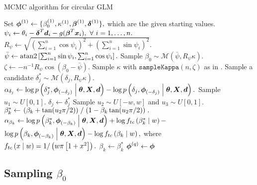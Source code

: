 \begin{algorithm}
\caption{MCMC algorithm for circular GLM}\label{alg}
\begin{algorithmic}
\State Set \( \boldsymbol{\phi}^{(1)} \gets \{ \beta_0^{(1)}, \kappa^{(1)}, \boldsymbol{\beta}^{(1)}, \boldsymbol{\delta}^{(1)} \},\) which are the given starting values.
  \State \( \psi_i \gets \theta_i - \boldsymbol{\delta}^T \boldsymbol{d}_i- g(\boldsymbol{\beta}^T \boldsymbol{x}_i ), ~ \forall ~ i = 1, \dots, n. \)
  \State \( R_\psi \gets \sqrt{ \left(\sum_{i = 1}^n \cos \psi_i \right) ^2 + \left( \sum_{i = 1}^n \sin \psi_i \right)^2}.\)
  \State \( \bar{\psi} \gets \operatorname{atan2} \left[ \sum_{i = 1}^n \sin \psi_i , \sum_{i = 1}^n \cos \psi_i  \right].\)
  \State Sample \( \beta_0 \sim \mathcal{M} \left(\bar{\psi}, R_\psi \kappa \right).\)
  \State \( \zeta \gets -  n^{-1} R_\psi \cos \left( \beta_0 - \bar{\psi} \right).\)
  \State Sample \( \kappa \) with \( \texttt{sampleKappa} (n, \zeta) \) as in \citet{forbes2015fast}.
    \State Sample a candidate \( \delta_j^{*} \sim \mathcal{M} \left( \delta_j, R_\psi \kappa \right).\)
    \State \( \alpha_{\delta_j} \gets \log p \left(\delta_j^{*}, \boldsymbol{\phi}_{(-\delta_j)} \mathrel{}\middle|\mathrel{} \boldsymbol{\theta}, \boldsymbol{X}, \boldsymbol{d} \right)  - \log p \left(\delta_j, \boldsymbol{\phi}_{(-\delta_j)} \mathrel{}\middle|\mathrel{} \boldsymbol{\theta}, \boldsymbol{X}, \boldsymbol{d} \right).\)
    \State Sample \( u_1 \sim U[0, 1]. \)
      \State \( \delta_j \gets \delta_j^{*} \)
    \EndIf
  \EndFor
    \State Sample \( u_2 \sim  U[-w, w] \) and \( u_3 \sim U[0, 1]. \)
    \State \( \beta_k^{*} \gets \left. \left( \beta_k + \tan(u_2 \pi / 2) \right) \mathrel{}\middle/\mathrel{} \left( 1 - \beta_k \tan(u_2 \pi / 2) \right) \right. .\)
    \State \( \alpha_{\beta_k} \gets \log p \left( \beta_k^{*}, \boldsymbol{\phi}_{(-\beta_k)}  \mathrel{}\middle|\mathrel{} \boldsymbol{\theta}, \boldsymbol{X}, \boldsymbol{d} \right) + \log f_{tc} \left(\beta_k^{*} \mathrel{}\middle|\mathrel{}  w \right) - \)
    \State  \hspace{1.055cm} \(  \log p \left(\beta_k, \boldsymbol{\phi}_{(-\beta_k)}  \mathrel{}\middle|\mathrel{} \boldsymbol{\theta}, \boldsymbol{X}, \boldsymbol{d} \right)      - \log f_{tc} \left( \beta_k \mathrel{}\middle|\mathrel{}  w \right), \)
    \State where \( f_{tc} \left( x \mathrel{}\middle|\mathrel{}  w \right) = 1 / \left( w \pi \left[ 1 + x^2 \right] \right).\)
      \State \( \beta_k \gets \beta_k^{*} \)
    \EndIf
  \EndFor
  \State \( \boldsymbol{\phi}^{(q)} \gets \boldsymbol{\phi} \)
\EndFor
\end{algorithmic}
\end{algorithm}





\subsection{Sampling $\beta_0$}

